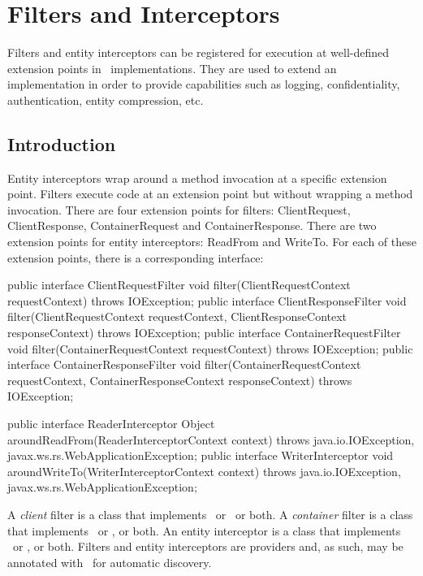 \chapter{Filters and Interceptors}
\label{filters_and_interceptors}

Filters and entity interceptors can be registered for execution at well-defined extension points in \jaxrs\ implementations. They are used to extend an implementation in order to provide capabilities such as logging, confidentiality, authentication, entity compression, etc. 

\section{Introduction}
\label{introduction_filters}
Entity interceptors wrap around a method invocation at a specific extension point. 
Filters execute code at an extension point but without wrapping a method invocation.  There are four extension points for filters: ClientRequest, ClientResponse, ContainerRequest and ContainerResponse. There are two extension points for entity interceptors: ReadFrom and WriteTo.  For each of these extension points, there is a corresponding interface:

\begin{listing}{1}
public interface ClientRequestFilter {
    void filter(ClientRequestContext requestContext) throws IOException;
}
public interface ClientResponseFilter {
    void filter(ClientRequestContext requestContext, 
        ClientResponseContext responseContext) throws IOException;
}
public interface ContainerRequestFilter {
    void filter(ContainerRequestContext requestContext) throws IOException;
}
public interface ContainerResponseFilter {
    void filter(ContainerRequestContext requestContext, 
        ContainerResponseContext responseContext) throws IOException;
}
\end{listing}

\begin{listing}{1}
public interface ReaderInterceptor {
    Object aroundReadFrom(ReaderInterceptorContext context)
        throws java.io.IOException, javax.ws.rs.WebApplicationException;
}
public interface WriterInterceptor {
    void aroundWriteTo(WriterInterceptorContext context)
        throws java.io.IOException, javax.ws.rs.WebApplicationException;
}
\end{listing}

A {\em client} filter is a class that implements \ClientRequestFilter\ or \ClientResponseFilter\, or both. A {\em container} filter is a class that implements \ContainerRequestFilter\ or \ContainerResponseFilter, or both. An entity interceptor is a class that implements \ReaderInterceptor\ or \WriterInterceptor, or both. Filters and entity interceptors are providers and, as such, may be annotated with \Provider\ for automatic discovery.

